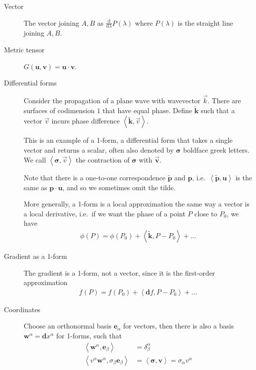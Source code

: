 \documentclass[12pt]{report}
\newcommand{\rd}[2]{\frac{\mathrm{d}#1}{\mathrm{d}#2}}
\newcommand{\bm}[1]{\boldsymbol{\mathbf{#1}}}
\newcommand{\expvalue}[1]{\left<#1\right>}
\begin{document}
\begin{description}
    \item[Vector] The vector joining $A,B$ as $\rd{}{\lambda}P(\lambda)$ where
        $P(\lambda)$ is the straight line joining $A,B$.

    \item[Metric tensor] $G(\bm{u}, \bm{v}) = \bm{u} \cdot
        \bm{v}$.

    \item[Differential forms] Consider the propagation of a plane wave with
        wavevector $\vec{k}$. There are surfaces of codimension $1$ that have
        equal phase. Define $\bm{\tilde{k}}$ such that a vector $\vec{v}$
        incurs phase difference $\expvalue{\bm{\tilde{k}}, \vec{v}}$.

        This is an example of a 1-form, a differential form that takes a single
        vector and returns a scalar, often also denoted by $\bm{\sigma}$
        boldface greek letters. We call $\expvalue{\bm{\sigma}, \vec{v}}$
        the contraction of $\bm{\sigma}$ with $\bm{\vec{v}}$.

        Note that there is a one-to-one correspondence $\bm{\tilde{p}}$ and
        $\bm{p}$, i.e.\ $\expvalue{\bm{\tilde{p}}, \bm{u}}$ is the
        same as $\bm{p} \cdot \bm{u}$, and so we sometimes omit the
        tilde.

        More generally, a 1-form is a local approximation the same way a vector
        is a local derivative, i.e.\ if we want the phase of a point $P$ close
        to $P_0$, we have
        \begin{align}
            \phi(P) = \phi(P_0) + \expvalue{\bm{\tilde{k}}, P - P_0} + \dots
        \end{align}

    \item[Gradient as a 1-form] The gradient is a 1-form, not a vector, since it
        is the first-order approximation
        \begin{align}
            f(P) = f(P_0) + \expvalue{\bm{d}f, P - P_0} +\dots
        \end{align}

    \item[Coordinates] Choose an orthonormal basis $\bm{e}_\alpha$ for
        vectors, then there is also a basis $\bm{w}^\alpha =
        \bm{d}x^\alpha$ for 1-forms, such that
        \begin{align}
            \expvalue{\bm{w}^\alpha, \bm{e}_\beta} &=
                \delta^\alpha_\beta\\
            \expvalue{v^\alpha \bm{w}^\alpha, \sigma_\beta \bm{e}_\beta}
                &= \expvalue{\bm{\sigma}, \bm{v}} = \sigma_\alpha
                v^\alpha
        \end{align}


\end{description}
\end{document}
